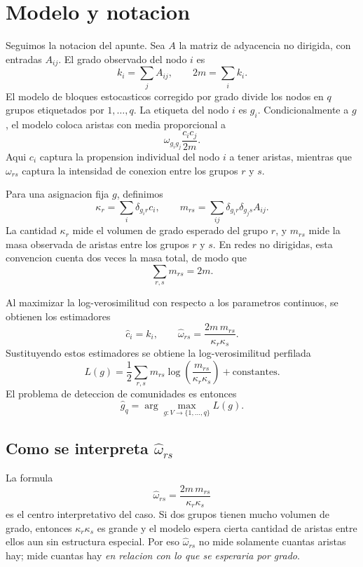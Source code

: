 \documentclass[11pt,letterpaper]{article}
\begin{document}
\section{Modelo y notacion}

Seguimos la notacion del apunte. Sea $A$ la matriz de adyacencia no dirigida, con entradas $A_{ij}$. El grado observado del nodo $i$ es
\[
    k_i=\sum_j A_{ij},
    \qquad
    2m=\sum_i k_i.
\]
El modelo de bloques estocasticos corregido por grado divide los nodos en $q$ grupos etiquetados por $1,\ldots,q$. La etiqueta del nodo $i$ es $g_i$. Condicionalmente a $g$, el modelo coloca aristas con media proporcional a
\[
    \omega_{g_i g_j}\frac{c_i c_j}{2m}.
\]
Aqui $c_i$ captura la propension individual del nodo $i$ a tener aristas, mientras que $\omega_{rs}$ captura la intensidad de conexion entre los grupos $r$ y $s$.

Para una asignacion fija $g$, definimos
\[
    \kappa_r=\sum_i \delta_{g_i r}c_i,
    \qquad
    m_{rs}=\sum_{ij}\delta_{g_i r}\delta_{g_j s}A_{ij}.
\]
La cantidad $\kappa_r$ mide el volumen de grado esperado del grupo $r$, y $m_{rs}$ mide la masa observada de aristas entre los grupos $r$ y $s$. En redes no dirigidas, esta convencion cuenta dos veces la masa total, de modo que
\[
    \sum_{r,s}m_{rs}=2m.
\]

Al maximizar la log-verosimilitud con respecto a los parametros continuos, se obtienen los estimadores
\[
    \hat c_i=k_i,
    \qquad
    \hat\omega_{rs}
    =
    \frac{2m\,m_{rs}}{\kappa_r\kappa_s}.
\]
Sustituyendo estos estimadores se obtiene la log-verosimilitud perfilada
\[
    L(g)
    =
    \frac{1}{2}\sum_{r,s}m_{rs}
    \log\left(\frac{m_{rs}}{\kappa_r\kappa_s}\right)
    +\text{constantes}.
\]
El problema de deteccion de comunidades es entonces
\[
    \hat g_q=\arg\max_{g:V\to\{1,\ldots,q\}} L(g).
\]

\subsection{Como se interpreta \texorpdfstring{$\hat\omega_{rs}$}{omega rs}}

La formula
\[
    \hat\omega_{rs}
    =
    \frac{2m\,m_{rs}}{\kappa_r\kappa_s}
\]
es el centro interpretativo del caso. Si dos grupos tienen mucho volumen de grado, entonces $\kappa_r\kappa_s$ es grande y el modelo espera cierta cantidad de aristas entre ellos aun sin estructura especial. Por eso $\hat\omega_{rs}$ no mide solamente cuantas aristas hay; mide cuantas hay \emph{en relacion con lo que se esperaria por grado}.
\end{document}
